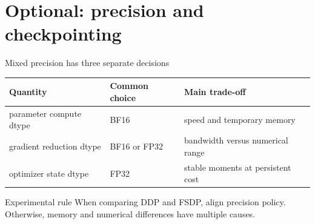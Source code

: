 \documentclass[handout]{beamer}
\begin{document}
\section{Optional: precision and checkpointing}
\begin{frame}{Mixed precision has three separate decisions}
  \small
  \begin{tabular}{@{}>{\raggedright\arraybackslash}p{.30\linewidth}>{\raggedright\arraybackslash}p{.22\linewidth}>{\raggedright\arraybackslash}p{.38\linewidth}@{}}
    \toprule
    Quantity & Common choice & Main trade-off \\
    \midrule
    parameter compute dtype & BF16 & speed and temporary memory \\
    gradient reduction dtype & BF16 or FP32 & bandwidth versus numerical range \\
    optimizer state dtype & FP32 & stable moments at persistent cost \\
    \bottomrule
  \end{tabular}
  \vfill
  \begin{block}{Experimental rule}
    When comparing DDP and FSDP, align precision policy. Otherwise, memory and numerical differences have multiple causes.
  \end{block}
\end{frame}
\end{document}
